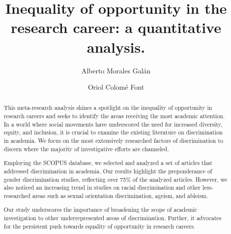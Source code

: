 \documentclass[runningheads]{llncs}
\begin{document}
\title{Inequality of opportunity in the research career: a quantitative analysis.}
\author{Alberto Morales Galán
\and
Oriol Colomé Font}
\maketitle              %
\begin{abstract}
This meta-research analysis shines a spotlight on the inequality of opportunity in research careers and seeks to identify the areas receiving the most academic attention. In a world where social movements have underscored the need for increased diversity, equity, and inclusion, it is crucial to examine the existing literature on discrimination in academia. We focus on the most extensively researched factors of discrimination to discern where the majority of investigative efforts are channeled.

Employing the SCOPUS database, we selected and analyzed a set of articles that addressed discrimination in academia. Our results highlight the preponderance of gender discrimination studies, reflecting over 75\% of the analyzed articles. However, we also noticed an increasing trend in studies on racial discrimination and other less-researched areas such as sexual orientation discrimination, ageism, and ableism.

Our study underscores the importance of broadening the scope of academic investigation to other underrepresented areas of discrimination. Further, it advocates for the persistent push towards equality of opportunity in research careers.

\end{abstract}

\end{document}
